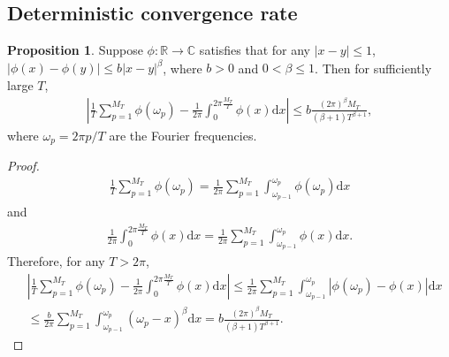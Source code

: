\documentclass[11pt]{article}
\numberwithin{equation}{section}
\theoremstyle{plain}
\theoremstyle{definition}
\theoremstyle{definition}
\theoremstyle{assumption}
\theoremstyle{proposition}
\newtheorem{proposition}{Proposition}[section]
\theoremstyle{proposition}
\theoremstyle{example}
\theoremstyle{lemma}
\theoremstyle{theorem}
\theoremstyle{remark}
\begin{document}
\subsection{Deterministic convergence rate}
\begin{proposition}\label{conv_rate_Riemann_sum_prop}
Suppose $\phi:\mathbb{R}\rightarrow\mathbb{C}$ satisfies that for any $|x-y|\leqslant 1$, $|\phi(x) - \phi(y)|\leqslant b|x-y|^{\beta}$, where $b>0$ and $0<\beta\leqslant1$. Then for sufficiently large $T$,
\begin{align*}
\left|\frac{1}{T}\sum_{p=1}^{M_T} \phi(\omega_p) - \frac{1}{2\pi}\int_0^{2\pi\frac{M_T}{T}}\phi(x)\mathrm{d}x \right|
\leqslant b \frac{(2\pi)^{\beta}M_T}{(\beta+1)T^{\beta+1}} ,
\end{align*}
where $\omega_p = 2\pi p/T$ are the Fourier frequencies.
\begin{proof}
\begin{align*}
\frac{1}{T}\sum_{p=1}^{M_T} \phi(\omega_p)
=\frac{1}{2\pi}\sum_{p=1}^{M_T} \int_{\omega_{p-1}}^{\omega_p} \phi(\omega_p)\mathrm{d}x
\end{align*}
and
\begin{align*}
\frac{1}{2\pi}\int_0^{2\pi\frac{M_T}{T}}\phi(x)\mathrm{d}x
=\frac{1}{2\pi}\sum_{p=1}^{M_T} \int_{\omega_{p-1}}^{\omega_p} \phi(x)\mathrm{d}x .
\end{align*}
Therefore, for any $T> 2\pi$,
\begin{align*}
&\left|\frac{1}{T}\sum_{p=1}^{M_T} \phi(\omega_p) - \frac{1}{2\pi}\int_0^{2\pi\frac{M_T}{T}}\phi(x)\mathrm{d}x \right|
\leqslant\frac{1}{2\pi}\sum_{p=1}^{M_T} \int_{\omega_{p-1}}^{\omega_p} |\phi(\omega_p) - \phi(x)|\mathrm{d}x \\
&\leqslant \frac{b}{2\pi}\sum_{p=1}^{M_T} \int_{\omega_{p-1}}^{\omega_p} (\omega_p - x)^{\beta}\mathrm{d}x
=b \frac{(2\pi)^{\beta}M_T}{(\beta+1)T^{\beta+1}}.
\end{align*}

\end{proof}
\end{proposition}
\end{document}
